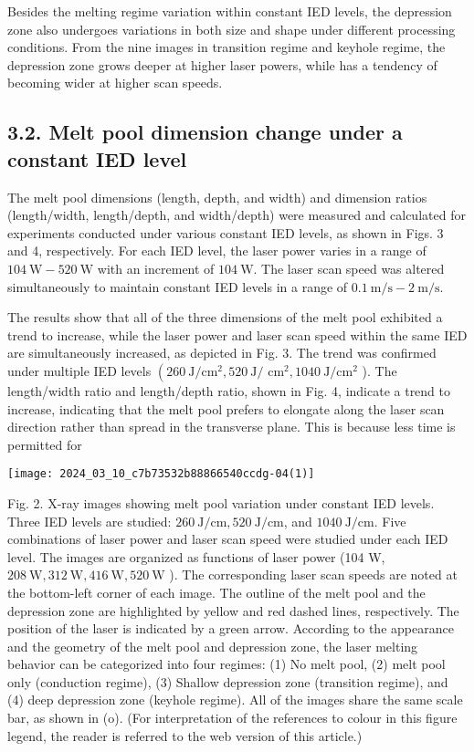 \documentclass[10pt]{article}
\begin{document}
Besides the melting regime variation within constant IED levels, the depression zone also undergoes variations in both size and shape under different processing conditions. From the nine images in transition regime and keyhole regime, the depression zone grows deeper at higher laser powers, while has a tendency of becoming wider at higher scan speeds.

\subsection*{3.2. Melt pool dimension change under a constant IED level}
The melt pool dimensions (length, depth, and width) and dimension ratios (length/width, length/depth, and width/depth) were measured and calculated for experiments conducted under various constant IED levels, as shown in Figs. 3 and 4, respectively. For each IED level, the laser power varies in a range of $104 \mathrm{~W}-520 \mathrm{~W}$ with an increment of $104 \mathrm{~W}$. The laser scan speed was altered simultaneously to maintain constant IED levels in a range of $0.1 \mathrm{~m} / \mathrm{s}-2 \mathrm{~m} / \mathrm{s}$.

The results show that all of the three dimensions of the melt pool exhibited a trend to increase, while the laser power and laser scan speed within the same IED are simultaneously increased, as depicted in Fig. 3. The trend was confirmed under multiple IED levels $\left(260 \mathrm{~J} / \mathrm{cm}^{2}, 520 \mathrm{~J} /\right.$ $\mathrm{cm}^{2}, 1040 \mathrm{~J} / \mathrm{cm}^{2}$ ). The length/width ratio and length/depth ratio, shown in Fig. 4, indicate a trend to increase, indicating that the melt pool prefers to elongate along the laser scan direction rather than spread in the transverse plane. This is because less time is permitted for

\begin{center}
\texttt{[image: 2024\_03\_10\_c7b73532b88866540ccdg-04(1)]}
\end{center}

Fig. 2. X-ray images showing melt pool variation under constant IED levels. Three IED levels are studied: $260 \mathrm{~J} / \mathrm{cm}, 520 \mathrm{~J} / \mathrm{cm}$, and $1040 \mathrm{~J} / \mathrm{cm}$. Five combinations of laser power and laser scan speed were studied under each IED level. The images are organized as functions of laser power (104 W, $208 \mathrm{~W}, 312 \mathrm{~W}, 416 \mathrm{~W}, 520 \mathrm{~W}$ ). The corresponding laser scan speeds are noted at the bottom-left corner of each image. The outline of the melt pool and the depression zone are highlighted by yellow and red dashed lines, respectively. The position of the laser is indicated by a green arrow. According to the appearance and the geometry of the melt pool and depression zone, the laser melting behavior can be categorized into four regimes: (1) No melt pool, (2) melt pool only (conduction regime), (3) Shallow depression zone (transition regime), and (4) deep depression zone (keyhole regime). All of the images share the same scale bar, as shown in (o). (For interpretation of the references to colour in this figure legend, the reader is referred to the web version of this article.)
\end{document}
